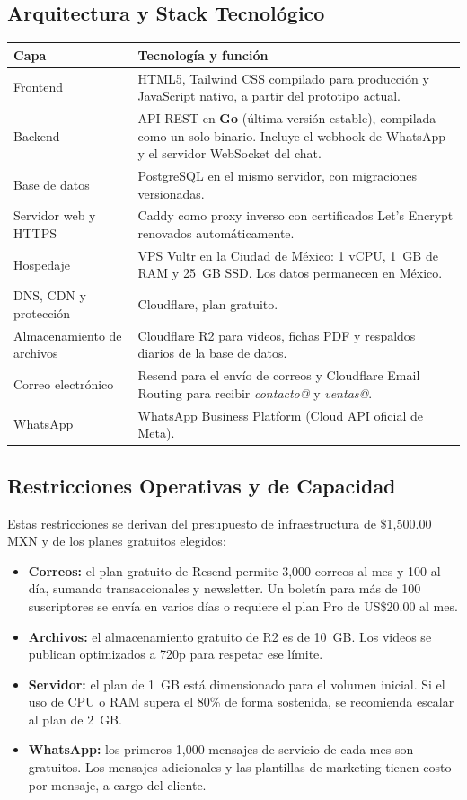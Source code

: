 \documentclass[11pt,letterpaper]{article}
\begin{document}
\subsection{Arquitectura y Stack Tecnológico}
\renewcommand{\arraystretch}{1.3}
\begin{longtable}{@{} >{\raggedright\arraybackslash}p{3.6cm} >{\raggedright\arraybackslash}p{12.2cm} @{}}
\toprule
\textbf{Capa} & \textbf{Tecnología y función} \\
\midrule
\endhead
\bottomrule
\endfoot
Frontend & HTML5, Tailwind CSS compilado para producción y JavaScript nativo, a partir del prototipo actual. \\
Backend & API REST en \textbf{Go} (última versión estable), compilada como un solo binario. Incluye el webhook de WhatsApp y el servidor WebSocket del chat. \\
Base de datos & PostgreSQL en el mismo servidor, con migraciones versionadas. \\
Servidor web y HTTPS & Caddy como proxy inverso con certificados Let's Encrypt renovados automáticamente. \\
Hospedaje & VPS Vultr en la Ciudad de México: 1 vCPU, 1~GB de RAM y 25~GB SSD. Los datos permanecen en México. \\
DNS, CDN y protección & Cloudflare, plan gratuito. \\
Almacenamiento de archivos & Cloudflare R2 para videos, fichas PDF y respaldos diarios de la base de datos. \\
Correo electrónico & Resend para el envío de correos y Cloudflare Email Routing para recibir \textit{contacto@} y \textit{ventas@}. \\
WhatsApp & WhatsApp Business Platform (Cloud API oficial de Meta). \\
\end{longtable}

\subsection{Restricciones Operativas y de Capacidad}
Estas restricciones se derivan del presupuesto de infraestructura de \$1,500.00 MXN y de los planes gratuitos elegidos:
\begin{itemize}[leftmargin=1.5em]
    \item \textbf{Correos:} el plan gratuito de Resend permite 3,000 correos al mes y 100 al día, sumando transaccionales y newsletter. Un boletín para más de 100 suscriptores se envía en varios días o requiere el plan Pro de US\$20.00 al mes.
    \item \textbf{Archivos:} el almacenamiento gratuito de R2 es de 10~GB. Los videos se publican optimizados a 720p para respetar ese límite.
    \item \textbf{Servidor:} el plan de 1~GB está dimensionado para el volumen inicial. Si el uso de CPU o RAM supera el 80\% de forma sostenida, se recomienda escalar al plan de 2~GB.
    \item \textbf{WhatsApp:} los primeros 1,000 mensajes de servicio de cada mes son gratuitos. Los mensajes adicionales y las plantillas de marketing tienen costo por mensaje, a cargo del cliente.
\end{itemize}
\end{document}
